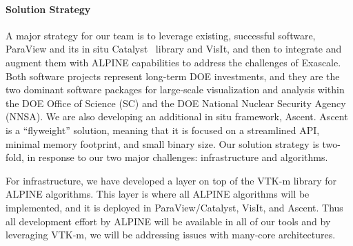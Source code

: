\paragraph{Solution Strategy}

A major strategy for our team is to leverage existing, successful software, ParaView and its in situ Catalyst~\cite{Catalyst} library and VisIt, and then to integrate and augment them with ALPINE capabilities to address the challenges of Exascale. 
%
Both software projects represent long-term DOE investments, and they are the two dominant software packages for large-scale visualization and analysis within the DOE Office of Science (SC) and the DOE National Nuclear Security Agency (NNSA). 
%
We are also developing an additional  in situ framework, Ascent.  Ascent is a ``flyweight'' solution, meaning that it is focused on a streamlined API, minimal memory footprint, and small binary size.
Our solution strategy is two-fold, in response to our two major challenges: infrastructure and algorithms.

For infrastructure, we have developed a layer on top of the VTK-m library for ALPINE algorithms.
This layer is where all ALPINE algorithms will be implemented, and it is deployed in ParaView/Catalyst, VisIt, and Ascent.
Thus all development effort by ALPINE will be available in all of our tools and by leveraging VTK-m, we will be addressing issues with many-core architectures.  


